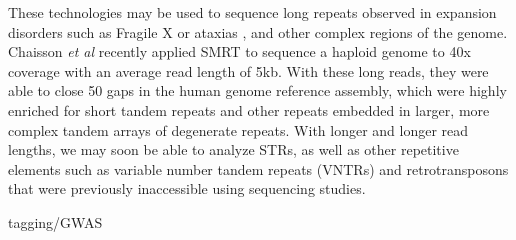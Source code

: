 These technologies may be used to sequence long repeats observed in expansion disorders such as Fragile X \cite{LoomisEidPelusoEtAl2012} or ataxias \cite{DoiMonjoHoangEtAl2013}, and other complex regions of the genome. Chaisson \emph{et al} \cite{ChaissonHuddlestonDennisEtAl2015} recently applied SMRT to sequence a haploid genome to 40x coverage with an average read length of 5kb. With these long reads, they were able to close 50 gaps in the human genome reference assembly, which were highly enriched for short tandem repeats and other repeats embedded in larger, more complex tandem arrays of degenerate repeats. With longer and longer read lengths, we may soon be able to analyze STRs, as well as other repetitive elements such as variable number tandem repeats (VNTRs) and retrotransposons that were previously inaccessible using sequencing studies.




tagging/GWAS
